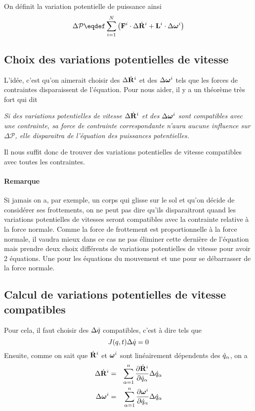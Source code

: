 On définit la variation potentielle de puissance ainsi
\[ \Delta \mathcal{P} \eqdef \sum_{i = 1}^N \left(\fv{F}^i \cdot \Delta \xgd^i + \st^i \cdot \Delta \omegaf^i\right) \]

\subsection{Choix des variations potentielles de vitesse}
L'idée, c'est qu'on aimerait choisir des $\Delta \dot{\bf R}^i$ et des $\Delta {\bm \omega}^i$ tels que les forces de contraintes disparaissent de l'équation.
Pour nous aider, il y a un théorème très fort qui dit
\begin{center}
  {\it
    Si des variations potentielles de vitesse $\Delta \dot{\bf R}^i$ et des
    $\Delta {\bm \omega}^i$ sont compatibles avec une contrainte,
    sa force de contrainte correspondante n'aura aucune influence
    sur $\Delta \mathcal{P}$,
    elle disparaitra de l'équation des puissances potentielles.
  }
\end{center}

Il nous suffit donc de trouver des variations potentielles de vitesse compatibles avec toutes les contraintes.

\paragraph{Remarque}
Si jamais on a, par exemple, un corps qui glisse sur le sol et qu'on décide de considérer ses frottements,
on ne peut pas dire qu'ils disparaitront quand les variations potentielles de vitesses seront compatibles avec la contrainte relative à la force normale.
Comme la force de frottement est proportionnelle à la force normale, il vaudra mieux dans ce cas ne pas éliminer cette dernière de l'équation mais prendre deux choix différents de variations potentielles de vitesse pour avoir 2 équations.
Une pour les équations du mouvement et une pour se débarrasser de la force normale.

\subsection{Calcul de variations potentielles de vitesse compatibles}
Pour cela, il faut choisir des $\Delta \dot{q}$ compatibles, c'est à dire tels que
\[ J(q, t) \Delta \dot{q} = 0 \]
Ensuite,
comme on sait que $\dot{\bf R}^i$ et ${\bm \omega}^i$
sont linéairement dépendents des $\dot{q}_\alpha$, on a
\begin{eqnarray*}
  \Delta \dot{\bf R}^i &=& \sum_{\alpha = 1}^n \frac{\partial \dot{\bf R}^i}{\partial \dot{q}_\alpha} \Delta \dot{q}_\alpha\\
  \Delta {\bm \omega}^i &=& \sum_{\alpha = 1}^n \frac{\partial {\bm \omega}^i}{\partial \dot{q}_\alpha} \Delta \dot{q}_\alpha
\end{eqnarray*}

